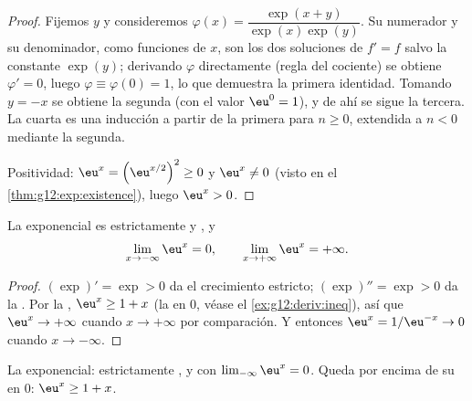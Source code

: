 \begin{proof}
Fijemos $y$ y consideremos
$\varphi(x) = \dfrac{\exp(x+y)}{\exp(x)\exp(y)}$. Su numerador y su
denominador, como funciones de $x$, son los dos soluciones de $f' = f$
salvo la constante $\exp(y)$; derivando $\varphi$ directamente (regla del
cociente) se obtiene $\varphi' = 0$, luego
$\varphi \equiv \varphi(0) = 1$, lo que demuestra la primera identidad.
Tomando $y = -x$ se obtiene la segunda (con el valor $\eu^0 = 1$), y de ahí
se sigue la tercera. La cuarta es una inducción a partir de la primera para
$n \geq 0$, extendida a $n < 0$ mediante la segunda.

Positividad: $\eu^x = \left(\eu^{x/2}\right)^2 \geq 0$ y $\eu^x \neq 0$
(visto en el \cref{thm:g12:exp:existence}), luego $\eu^x > 0$.
\end{proof}

\begin{proposition}\label{prop:g12:exp:variations}
La exponencial es estrictamente  y , y
\[
\lim_{x\to-\infty} \eu^x = 0, \qquad
\lim_{x\to+\infty} \eu^x = +\infty .
\]
\end{proposition}

\begin{proof}
$(\exp)' = \exp > 0$ da el crecimiento estricto; $(\exp)'' = \exp > 0$ da
la . Por la , $\eu^x \geq 1 + x$ (la  en $0$,
véase el \cref{ex:g12:deriv:ineq}), así que $\eu^x \to +\infty$ cuando
$x \to +\infty$ por comparación. Y entonces
$\eu^{x} = 1/\eu^{-x} \to 0$ cuando $x \to -\infty$.
\end{proof}

\begin{omfigure}

{\small La exponencial: estrictamente ,  y con
$\lim_{-\infty} \eu^x = 0$. Queda por encima de su  en $0$:
$\eu^x \geq 1 + x$.}
\end{omfigure}

